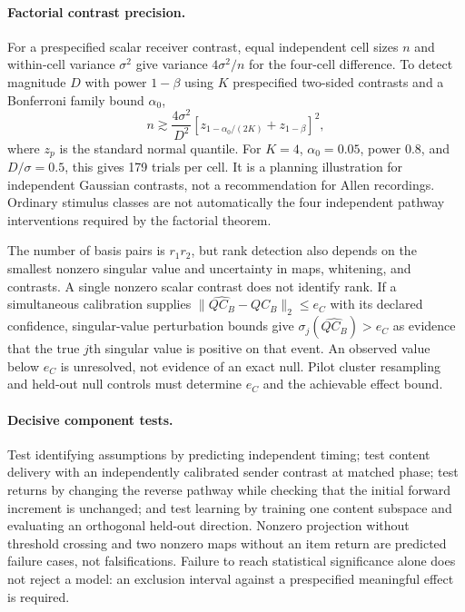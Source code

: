 \paragraph{Factorial contrast precision.} For a prespecified scalar receiver contrast, equal independent cell sizes $n$ and within-cell variance $\sigma^2$ give variance $4\sigma^2/n$ for the four-cell difference. To detect magnitude $D$ with power $1-\beta$ using $K$ prespecified two-sided contrasts and a Bonferroni family bound $\alpha_0$,
\begin{equation}
n\gtrsim\frac{4\sigma^2}{D^2}
\left[z_{1-\alpha_0/(2K)}+z_{1-\beta}\right]^2,
\label{eq:factorial-power}
\end{equation}
where $z_p$ is the standard normal quantile. For $K=4$, $\alpha_0=0.05$, power 0.8, and $D/\sigma=0.5$, this gives 179 trials per cell. It is a planning illustration for independent Gaussian contrasts, not a recommendation for Allen recordings. Ordinary stimulus classes are not automatically the four independent pathway interventions required by the factorial theorem.

The number of basis pairs is $r_1r_2$, but rank detection also depends on the smallest nonzero singular value and uncertainty in maps, whitening, and contrasts. A single nonzero scalar contrast does not identify rank. If a simultaneous calibration supplies $\|\widehat{QC_B}-QC_B\|_2\le e_C$ with its declared confidence, singular-value perturbation bounds give $\sigma_j(\widehat{QC_B})>e_C$ as evidence that the true $j$th singular value is positive on that event. An observed value below $e_C$ is unresolved, not evidence of an exact null. Pilot cluster resampling and held-out null controls must determine $e_C$ and the achievable effect bound.

\paragraph{Decisive component tests.} Test identifying assumptions by predicting independent timing; test content delivery with an independently calibrated sender contrast at matched phase; test returns by changing the reverse pathway while checking that the initial forward increment is unchanged; and test learning by training one content subspace and evaluating an orthogonal held-out direction. Nonzero projection without threshold crossing and two nonzero maps without an item return are predicted failure cases, not falsifications. Failure to reach statistical significance alone does not reject a model: an exclusion interval against a prespecified meaningful effect is required.
